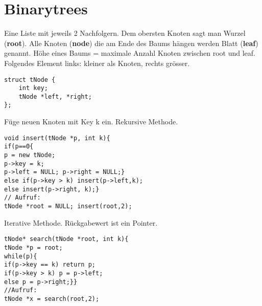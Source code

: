 \section{Binarytrees}
Eine Liste mit jeweils 2 Nachfolgern. Dem obersten Knoten sagt man Wurzel (\textbf{root}). 
Alle Knoten (\textbf{node}) die am Ende des Baums hängen werden Blatt (\textbf{leaf}) genannt. 
Höhe eines Baums = maximale Anzahl Knoten zwischen root und leaf.
Folgendes Element links: kleiner als Knoten, rechts grösser.
\begin{lstlisting}[mathescape]
struct tNode {
	int key;
	tNode *left, *right;
};
\end{lstlisting}

Füge neuen Knoten mit Key k ein. Rekursive Methode.
\begin{lstlisting}[mathescape]
void insert(tNode *p, int k){
if(p==0{
p = new tNode;
p->key = k;
p->left = NULL; p->right = NULL;}
else if(p->key > k) insert(p->left,k);
else insert(p->right, k);}
// Aufruf:
tNode *root = NULL; insert(root,2); 
\end{lstlisting}
Iterative Methode. Rückgabewert ist ein Pointer.
\begin{lstlisting}[mathescape]
tNode* search(tNode *root, int k){
tNode *p = root;
while(p){
if(p->key == k) return p;
if(p->key > k) p = p->left;
else p = p->right;}}
//Aufruf:
tNode *x = search(root,2);
\end{lstlisting}
